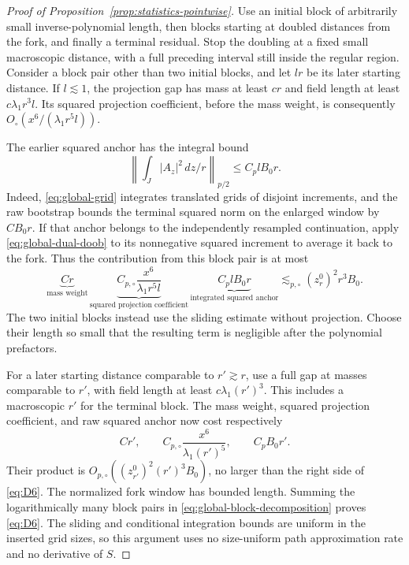 \begin{proof}[Proof of Proposition~\ref{prop:statistics-pointwise}]
Use an initial block of arbitrarily small inverse-polynomial length,
then blocks starting at doubled distances from the fork, and finally
a terminal residual. Stop the doubling at a fixed small macroscopic
distance, with a full preceding interval still inside the regular
region. Consider a block pair other than two initial blocks, and let
$lr$ be its later starting distance. If $l\lesssim1$, the projection
gap has mass at least $cr$ and field length at least
$c\lambda_1r^3l$. Its squared projection coefficient, before the mass
weight, is consequently
$O_\circ(x^6/(\lambda_1r^5l))$.

The earlier squared anchor has the integral bound
\[
 \left\|\int_J|A_z|^2\,dz/r\right\|_{p/2}
 \le C_p lB_0r.
\]
Indeed, \eqref{eq:global-grid} integrates translated grids of disjoint
increments, and the raw bootstrap bounds the terminal squared norm on
the enlarged window by $CB_0r$. If that anchor belongs to the
independently resampled continuation, apply
\eqref{eq:global-dual-doob} to its nonnegative squared increment to
average it back to the fork. Thus the contribution from this block
pair is at most
\[
 \underbrace{Cr}_{\text{mass weight}}\,
 \underbrace{C_{p,\circ}\frac{x^6}{\lambda_1r^5l}}
             _{\text{squared projection coefficient}}\,
 \underbrace{C_p lB_0r}_{\text{integrated squared anchor}}
 \lesssim_{p,\circ}(z_r^0)^2r^3B_0.
\]
The two initial blocks instead use the sliding estimate without
projection. Choose their length so small that the resulting term is
negligible after the polynomial prefactors.

For a later starting distance comparable to $r'\gtrsim r$, use a
full gap at masses comparable to $r'$, with field length at least
$c\lambda_1(r')^3$. This includes a macroscopic $r'$ for the
terminal block. The mass weight, squared projection coefficient, and
raw squared anchor now cost respectively
\[
 Cr',\qquad
 C_{p,\circ}\frac{x^6}{\lambda_1(r')^5},\qquad
 C_pB_0r'.
\]
Their product is
$O_{p,\circ}((z_{r'}^0)^2(r')^3B_0)$, no larger than the
right side of \eqref{eq:D6}. The normalized fork window has bounded
length. Summing the logarithmically many block pairs in
\eqref{eq:global-block-decomposition} proves \eqref{eq:D6}. The
sliding and conditional integration bounds are uniform in the inserted
grid sizes, so this argument uses no size-uniform path approximation
rate and no derivative of $S$.


\end{proof}
